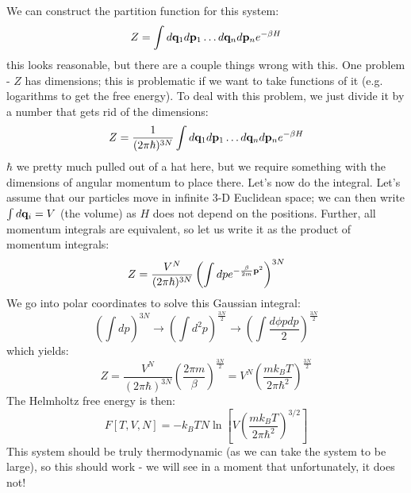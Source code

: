 We can construct the partition function for this system:
\begin{equation}
    Z = \int d\mathbf{q}_1 d\mathbf{p}_1 \ldots d\mathbf{q}_n d\mathbf{p}_n e^{-\beta H}
\end{equation}
this looks reasonable, but there are a couple things wrong with this. One problem - $Z$ has dimensions; this is problematic if we want to take functions of it (e.g. logarithms to get the free energy). To deal with this problem, we just divide it by a number that gets rid of the dimensions:
\begin{equation}
    Z = \frac{1}{(2\pi \hbar)^{3N}}\int d\mathbf{q}_1 d\mathbf{p}_1 \ldots d\mathbf{q}_n d\mathbf{p}_n e^{-\beta H}
\end{equation}
$\hbar$ we pretty much pulled out of a hat here, but we require something with the dimensions of angular momentum to place there. Let's now do the integral. Let's assume that our particles move in infinite 3-D Euclidean space; we can then write $\int d\mathbf{q}_i = V$ (the volume) as $H$ does not depend on the positions. Further, all momentum integrals are equivalent, so let us write it as the product of momentum integrals:
\begin{equation}
    Z = \frac{V^N}{(2\pi \hbar)^{3N}}\left(\int dp e^{-\frac{\beta}{2m}\mathbf{p}^2}\right)^{3N}
\end{equation}
We go into polar coordinates to solve this Gaussian integral:
\begin{equation}
    \left(\int dp\right)^{3N} \to \left(\int d^2p\right)^{\frac{3N}{2}} \to \left(\int \frac{d\phi pdp}{2}\right)^{\frac{3N}{2}}
\end{equation}
which yields:
\begin{equation}
    Z = \frac{V^N}{(2\pi \hbar)^{3N}} \left(\frac{2\pi m}{\beta}\right)^{\frac{3N}{2}} = V^N\left(\frac{mk_B T}{2\pi \hbar^2}\right)^{\frac{3N}{2}}
\end{equation}
The Helmholtz free energy is then:
\begin{equation}
    F[T, V, N] = -k_B T N\ln \left[V\left(\frac{mk_B T}{2\pi \hbar^2}\right)^{3/2}\right]
\end{equation}
This system should be truly thermodynamic (as we can take the system to be large), so this should work - we will see in a moment that unfortunately, it does not!


